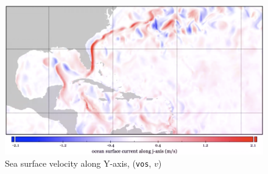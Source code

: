 
\begin{figure}
\includegraphics[width=0.93\linewidth]{images/example-images/vos.png}
\caption{Sea surface velocity along Y-axis, (\texttt{vos}, $v$)}
\label{fig:vos}
\end{figure}
